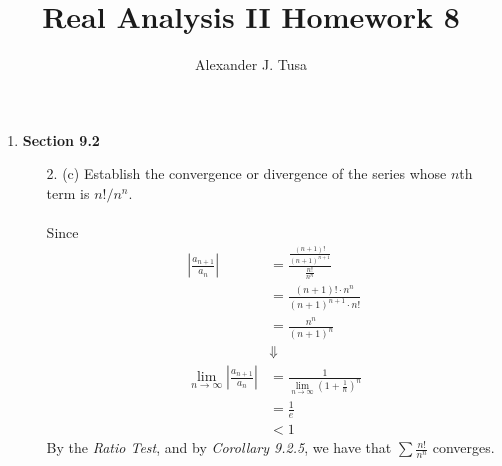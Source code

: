 \documentclass[12pt,letterpaper]{article}
\author{Alexander J. Tusa}
\title{Real Analysis II Homework 8}
\newcommand{\limx}[2]{\displaystyle\lim\limits_{#1 \to #2}}
\newcommand{\abs}[1]{\left\lvert #1 \right\rvert}
\theoremstyle{case}
\theoremstyle{definition}
\begin{document}
	\maketitle
	\begin{enumerate}
		\item \textbf{Section 9.2}
		\begin{enumerate}
			\item[2. (c)] Establish the convergence or divergence of the series whose $n$th term is $n!/n^n$.
			\\\\Since
			\begin{align*}
				\abs{\frac{a_{n+1}}{a_n}} &= \frac{\frac{(n+1)!}{(n+1)^{n+1}}}{\frac{n!}{n^n}} \\
				&= \frac{(n+1)!\cdot n^n}{(n+1)^{n+1}\cdot n!} \\
				&= \frac{n^n}{(n+1)^n} \\
				&\Downarrow \\
				\limx{n}{\infty} \abs{\frac{a_{n+1}}{a_n}} &= \frac{1}{\limx{n}{\infty} \left(1+\frac{1}{n}\right)^n} \\
				&= \frac{1}{e} \\
				&<1
			\end{align*}
			By the \textit{Ratio Test}, and by \textit{Corollary 9.2.5}, we have that $\sum \frac{n!}{n^n}$ converges.\\
			

\end{enumerate}
\end{enumerate}
\end{document}
